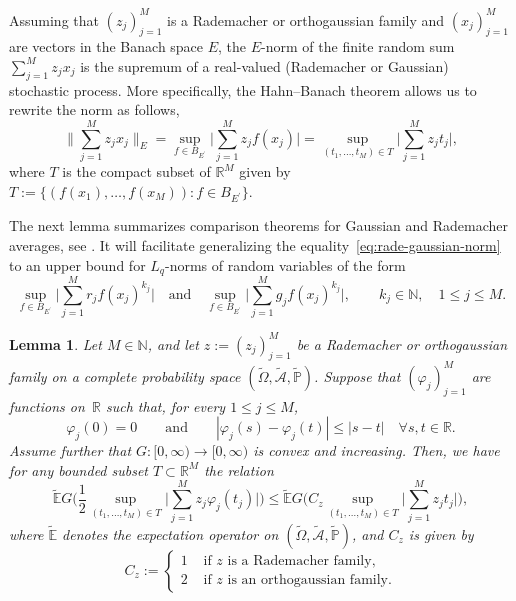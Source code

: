\documentclass[reqno]{amsart}
\numberwithin{equation}{section}
\newcommand{\bbE}{\mathbb{E}}
\newcommand{\bbN}{\mathbb{N}}
\newcommand{\bbP}{\mathbb{P}}
\newcommand{\bbR}{\mathbb{R}}
\newcommand{\cA}{\mathcal{A}}
\newcommand{\Omegat}{\widetilde{\Omega}}
\newcommand{\cAt}{\widetilde{\cA}}
\newcommand{\bbPt}{\widetilde{\bbP}}
\newcommand{\bbEt}{\widetilde{\bbE}}
\newcommand{\dual}[1]{{#1}^{\prime}}
\newcommand{\from}{\colon}
\newtheorem{lemma}{Lemma}[section]
\theoremstyle{remark}
\theoremstyle{definition}
\begin{document}
Assuming that $(z_j)_{j=1}^M$ is a Rademacher 
or orthogaussian family 
and $(x_j)_{j=1}^M$ are vectors in the Banach space $E$, 
the $E$-norm of the finite random sum 
$\sum_{j=1}^M z_j x_j$ 
is the supremum of a real-valued 
(Rademacher or Gaussian) stochastic process. 
More specifically, the Hahn--Banach theorem allows us to rewrite 
the norm as follows, 
% 
\begin{equation}\label{eq:rade-gaussian-norm} 
\biggl\| \sum_{j=1}^M z_j x_j \biggr\|_E 
= 
\sup_{f\in B_{\dual{E}}}  
\biggl| \sum_{j=1}^M z_j f(x_j) \biggr| 
= 
\sup_{(t_1,\ldots,t_M)\in T} 
\biggl| \sum_{j=1}^M z_j t_j \biggr| , 
\end{equation}
% 
where $T$ is the compact subset of $\bbR^M$\! given by 
$T:=\{ (f(x_1),\ldots,f(x_M)) : f\in B_{\dual{E}} \}$.  

The next lemma summarizes comparison theorems 
for Gaussian and Rademacher averages, see 
\cite[Corollary~3.17 \& Theorem~4.12]{LedouxTalagrand2011}. 
%
It will facilitate generalizing 
the equality~\eqref{eq:rade-gaussian-norm} 
to an upper bound for $L_q$-norms of 
random variables of the form 
% 
\[
\sup_{f\in B_{\dual{E}}}  
\biggl| \sum_{j=1}^M r_j f(x_j)^{k_j} \biggr| 
\quad \text{and} \quad 
\sup_{f\in B_{\dual{E}}}  
\biggl| \sum_{j=1}^M g_j f(x_j)^{k_j} \biggr|,
\qquad  
k_j\in\bbN, \quad 1\leq j \leq M. 
\]

\begin{lemma}\label{lem:rade-gaussian} 
	Let $M\in\bbN$, 
	and let $z := (z_j)_{j=1}^M$ be 
	a Rademacher or 
	orthogaussian family 
	on a complete probability space 
	$(\Omegat,\cAt,\bbPt)$. 
	Suppose that $(\varphi_j)_{j=1}^M$ are  
	functions on~$\bbR$ such that, 
	for every $1\leq j\leq M$,  
	\begin{equation}\label{eq:ass:contraction}
	\varphi_j(0) = 0 
	\qquad\text{and}\qquad 
	|\varphi_j(s) - \varphi_j(t)| 
	\leq 
	|s-t| 
	\quad \forall s,t\in\bbR. 
	\end{equation}
	Assume further that $G\from [0,\infty) \to [0,\infty)$ 
	is convex and increasing. Then, 
	we have for any bounded subset $T\subset\bbR^M$\!  
	the relation   
	\begin{equation}\label{eq:lem:rade-gaussian} 
	\widetilde{\bbE}
	G\Biggl( \frac{1}{2} 
	\sup_{(t_1,\ldots,t_M)\in T} 
	\biggl| 
	\sum_{j=1}^M 
	z_j \varphi_j(t_j) \biggr| 
	\Biggr) 
	\leq 
	\widetilde{\bbE} 
	G\Biggl(  
	C_z 
	\sup_{(t_1,\ldots,t_M)\in T} 
	\biggl| 
	\sum_{j=1}^M 
	z_j t_j \biggr| 
	\Biggr),   
	\end{equation} 
	where $\bbEt$ denotes the expectation operator 
	on $(\Omegat, \cAt, \bbPt)$, and $C_z$ is given by 
	\begin{equation}\label{eq:C-rade-gaussian} 
	C_z 
	:= 
	\begin{cases} 
	1 &\text{ if $z$ is a Rademacher family} , 
	\\
	2 &\text{ if $z$ is an orthogaussian family}. 
	\end{cases} 
	\end{equation}
\end{lemma}  
\end{document}
